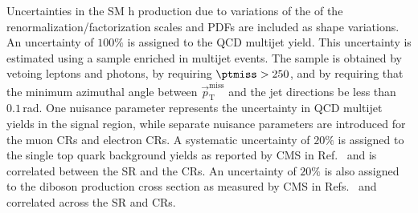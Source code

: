 Uncertainties in the SM h production due to variations of the of the renormalization/factorization scales and PDFs are included as shape variations. An uncertainty of $100\%$ is assigned to the QCD multijet yield. This uncertainty is estimated using a sample enriched in multijet events. The sample is obtained by vetoing leptons and photons, by requiring $\ptmiss>250$\GeV, and by requiring that the minimum azimuthal angle between $\vec{p}_{\mathrm{T}}^{\mathrm{miss}}$ and the jet directions be less than $0.1$\,rad. One nuisance parameter represents the uncertainty in QCD multijet yields in the signal region, while separate nuisance parameters are introduced for the muon CRs and electron CRs. A systematic uncertainty of $20\%$ is assigned to the single top quark background yields as reported by CMS in Ref.~\cite{Chatrchyan:1642680} and is correlated between the SR and the CRs. An uncertainty of $20\%$ is also assigned to the diboson production cross section as measured by CMS in Refs.~\cite{Khachatryan:2016txa,Khachatryan:2016tgp} and correlated across the SR and CRs.



